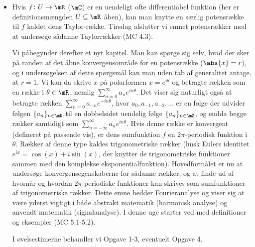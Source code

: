 \begin{itemize}
    \item Hvis $f\colon U \to \mR$ ($\mC$) er en uendeligt ofte differentiabel funktion (her er definitionsmængden $U \subseteq \mR$ åben), kan man knytte en særlig potensrække til $f$ kaldet dens Taylor-række. Tirsdag afslutter vi emnet potensrækker med at undersøge sådanne Taylorrækker (MC 4.3).
    
    Vi påbegynder derefter et nyt kapitel. Man kan spørge sig selv, hvad der sker på randen af det åbne konvergensområde for en potensrække ($\abs{x}=r$), og i undersøgelsen af dette spørgsmål kan man uden tab af generalitet antage, at $r=1$. Vi kan da skrive $x$ på polarformen $x=e^{i \theta}$ og betragte rækken som en række i $\theta\in\mR$, nemlig $\sum_{n=0}^\infty a_n e^{i n \theta}$. Det viser sig naturligt også at betragte rækken $\sum_{n=0}^\infty a_{-n} e^{-i n \theta}$, hvor $a_{0}, a_{-1}, a_{-2}, \ldots$ er en følge der udvider følgen $\{a_n\}_{n \in \mN}$ til en dobbelsidet uendelig følge $\{a_n\}_{n \in \mZ}$, og endda begge rækker samtidigt som $\sum_{n=-\infty}^\infty a_n e^{i n \theta}$. Hvis denne række er konvergent (defineret på passende vis), er dens sumfunktion $f$ en $2\pi$-periodisk funktion i $\theta$. Rækker af denne type kaldes trigonometriske rækker (husk Eulers identitet $e^{i x}= \cos(x)+ i \sin(x)$, der knytter de trigonometriske funktioner sammen med den komplekse eksponentialfunktion). Hovedformålet er nu at undersøge konvergensegenskaberne for sådanne rækker, og at finde ud af hvornår og hvordan $2\pi$-periodiske funktioner kan skrives som sumfunktioner af trigonometriske rækker.	Dette emne hedder Fourieranalyse og viser sig at være yderst vigtigt	i både abstrakt matematik (harmonisk analyse) og anvendt matematik (signalanalyse). I denne uge starter ved med definitioner og eksempler (MC 5.1-5.2).
    
    I øvelsestimerne behandler vi Opgave 1-3, eventuelt Opgave 4.
\end{itemize}

